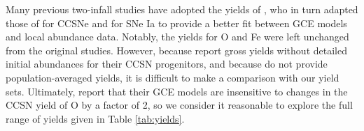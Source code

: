 \documentclass[twocolumn,twocolappendix,linenumbers]{aastex631}
\begin{document}
Many previous two-infall studies have adopted the yields of \citet{francois_evolution_2004}, who in turn adapted those of \citet{woosley_evolution_1995} for CCSNe and \citet{iwamoto_nucleosynthesis_1999} for SNe Ia to provide a better fit between GCE models and local abundance data. Notably, the yields for O and Fe were left unchanged from the original studies. However, because \citet{woosley_evolution_1995} report gross yields without detailed initial abundances for their CCSN progenitors, and because \citet{francois_evolution_2004} do not provide population-averaged yields, it is difficult to make a comparison with our yield sets. Ultimately, \citet{francois_evolution_2004} report that their GCE models are insensitive to changes in the CCSN yield of O by a factor of 2, so we consider it reasonable to explore the full range of yields given in Table \ref{tab:yields}.
\end{document}
